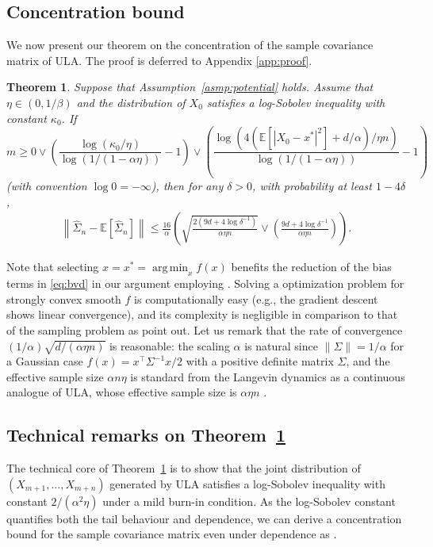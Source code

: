 \documentclass[12pt,reqno]{amsart}
\newtheorem{theorem}{Theorem}%
\theoremstyle{remark}
\theoremstyle{definition}
\newcommand{\E}{\mathbb{E}}
\DeclareMathOperator*{\argmin}{arg\,min}
\begin{document}
\subsection{Concentration bound}\label{sec:concentration:main}
We now present our theorem on the concentration of the sample covariance matrix of ULA.
The proof is deferred to Appendix \ref{app:proof}.
\begin{theorem}\label{thm:concentration}
    Suppose that Assumption~\ref{asmp:potential} holds.
    Assume that $\eta\in(0,1/\beta)$ and the distribution of $X_{0}$ satisfies a log-Sobolev inequality with constant $\kappa_{0}$.
    If 
    \begin{equation*}
        m\ge 0\vee\left(\frac{\log(\kappa_{0}/\eta)}{\log(1/(1-\alpha\eta))}-1\right)\vee \left(\frac{\log(4(\E[|X_{0}-x^{\ast}|^{2}]+d/\alpha)/\eta n)}{\log(1/(1-\alpha\eta))}-1\right)
    \end{equation*}
    (with convention $\log0=-\infty$), then for any $\delta>0$, with probability at least $1-4\delta$,
    \begin{align*}
        \left\|\hat{\Sigma}_{n}-\E\left[\hat{\Sigma}_{n}\right]\right\|\le \frac{16}{\alpha}\left(\sqrt{\frac{2(9d+4\log\delta^{-1})}{\alpha\eta n}}\vee \left(\frac{9 d+4\log\delta^{-1}}{\alpha\eta n}\right)\right).
    \end{align*}
\end{theorem}
Note that selecting $x=x^{\ast}=\argmin_{x}f(x)$ benefits the reduction of the bias terms in \eqref{eq:bvd} in our argument employing \citet{durmus2019high}.
Solving a optimization problem for strongly convex smooth $f$ is computationally easy (e.g., the gradient descent shows linear convergence), and its complexity is negligible in comparison to that of the sampling problem as \citet{altschuler2024faster} point out.
Let us remark that the rate of convergence $(1/\alpha)\sqrt{d/(\alpha\eta n)}$ is reasonable: the scaling $\alpha$ is natural since $\|\Sigma\|=1/\alpha$ for a Gaussian case $f(x)=x^{\top}\Sigma^{-1}x/2$ with a positive definite matrix $\Sigma$, and the effective sample size $\alpha n\eta$ is standard from the Langevin dynamics as a continuous analogue of ULA, whose effective sample size is $\alpha \eta n$ \citep[e.g., see][]{bakry2014analysis}.

\subsection{Technical remarks on Theorem~\ref{thm:concentration}}\label{sec:concentration:remark}
The technical core of Theorem~\ref{thm:concentration} is to show that the joint distribution of $(X_{m+1},\ldots,X_{m+n})$ generated by ULA satisfies a log-Sobolev inequality with constant $2/(\alpha^{2}\eta)$ under a mild burn-in condition.
As the log-Sobolev constant quantifies both the tail behaviour and dependence, we can derive a concentration bound for the sample covariance matrix even under dependence as \citet{adamczak2015note}.
\end{document}
